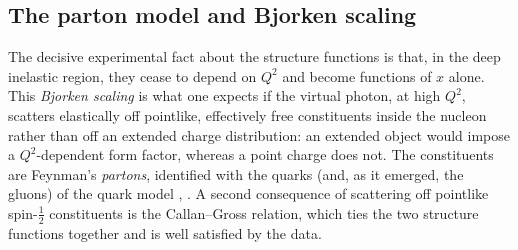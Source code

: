 \FloatBarrier

\subsection{The parton model and Bjorken scaling}
\label{subsec:parton-model}

The decisive experimental fact about the structure functions is that, in the deep
inelastic region, they cease to depend on $Q^{2}$ and become functions of $x$ alone.
This \emph{Bjorken scaling} is what one expects if the virtual photon, at high $Q^{2}$,
scatters elastically off pointlike, effectively free constituents inside the nucleon
rather than off an extended charge distribution: an extended object would impose a
$Q^{2}$-dependent form factor, whereas a point charge does not. The constituents are
Feynman's \emph{partons}, identified with the quarks (and, as it emerged, the gluons) of
the quark model \cite[Ch.~1]{Amsler2018}, \cite[Ch.~4.1]{ThomasWeise2001}. A second
consequence of scattering off pointlike spin-$\tfrac{1}{2}$ constituents is the
Callan--Gross relation, which ties the two structure functions together and is well
satisfied by the data.

